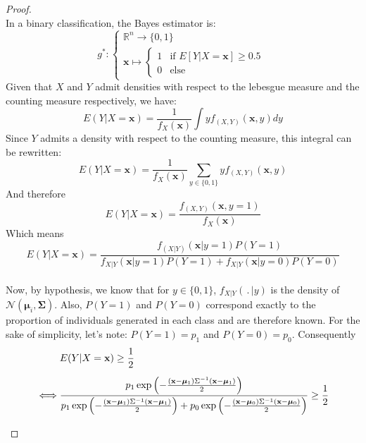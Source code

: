 \documentclass[preprint,12pt]{elsarticle}
\begin{document}
\begin{proof} \phantom{A}\\
In a binary classification, the Bayes estimator is:\\
\begin{equation}
    g^* : \begin{cases}
    \mathbb{R}^n \longrightarrow \{0, 1\} \\[3 pt]
    \mathbf{x} \longmapsto 
    \begin{cases}
        1 & \text{if } E[Y|X = \mathbf{x}] \geq 0.5  \\
        0 & \text{else}
    \end{cases}
    \end{cases}
\end{equation}
Given that $X$ and $Y$ admit densities with respect to the lebesgue measure and the counting measure respectively, we have:
\begin{equation}
    E(Y|X = \mathbf{x}) = \frac{1}{f_X(\mathbf{x})} \int\limits yf_{(X, Y)}(\mathbf{x}, y) dy
\end{equation}
Since $Y$ admits a density with respect to the counting measure, this integral can be rewritten:
\begin{equation}
    E(Y|X = \mathbf{x}) = \frac{1}{f_X(\mathbf{x})} \sum\limits_{y \in \{0,1\}} yf_{(X, Y)}(\mathbf{x}, y) 
\end{equation}
And therefore
\begin{equation}
    E(Y|X = \mathbf{x}) = \frac{f_{(X, Y)}(\mathbf{x}, y = 1)}{f_X(\mathbf{x})}
\end{equation}
Which means
\begin{equation}
    E(Y|X = \mathbf{x}) = \frac{f_{(X| Y)}(\mathbf{x}| y = 1) P(Y = 1)}{f_{X|Y}(\mathbf{x} | y = 1) P(Y = 1) + f_{X|Y}(\mathbf{x} | y = 0) P(Y = 0)}
\end{equation}
\phantom{a}\\
Now, by hypothesis, we know that for $y \in \{0, 1\}$, $f_{X|Y}(\,.\, |y)$ is the density of $\mathcal{N}(\bm{\mu}_i, \bm{\Sigma})$. Also, $P(Y = 1)$ and $P(Y = 0)$ correspond exactly to the proportion of individuals generated in each class and are therefore known. For the sake of simplicity, let's note: $P(Y = 1) = p_1$ and $P(Y = 0) = p_0$. Consequently\\ 
 \begin{align}
    & E(Y|X = \mathbf{x}) \geq \frac{1}{2} \hspace{2 cm} \phantom{2}  \\[5 pt]
     \iff  & \frac{p_1\exp \left( -\frac{(\mathbf{x} - \bm{\mu}_1)\Sigma^{-1}(\mathbf{x} - \bm{\mu}_1)}{2} \right)}{p_1\exp\left(  -\frac{(\mathbf{x} - \bm{\mu}_1)\Sigma^{-1}(\mathbf{x} - \bm{\mu}_1)}{2}\right) + p_0\exp\left( -\frac{(\mathbf{x} - \bm{\mu}_0)\Sigma^{-1}(\mathbf{x} - \bm{\mu}_0)}{2}\right)} \geq \frac{1}{2}\\[5 pt]

\end{align}
\end{proof}
\end{document}
